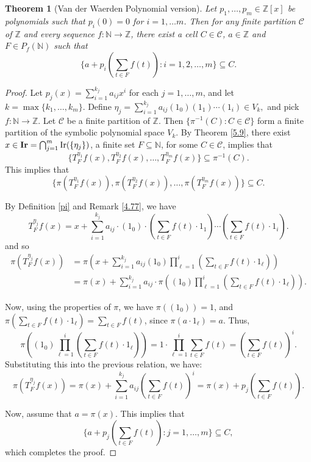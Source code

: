 \documentclass{amsart}
\newtheorem{theorem}{Theorem}[section]
\theoremstyle{definition}
\theoremstyle{remark}
\numberwithin{equation}{section}
\newcommand{\Ir}{{\bf{Ir}}}
\begin{document}
\begin{theorem}[Van der Waerden Polynomial version]{\label{van}}
Let $p_1,\ldots,p_m\in \mathbb{Z}[x]$ be polynomials such that $p_i(0)=0$ for $i=1,\ldots m$. Then for any finite partition $\mathcal{C}$ of \( \mathbb{Z} \) and every sequence $f:\mathbb{N}\to \mathbb{Z}$, there exist a cell $C\in\mathcal{C}$,  \(a \in \mathbb{Z} \) and $F\in P_f(\mathbb{N})$ such that
	 \[
	\{a+p_i(\sum_{t\in F}f(t)):i=1,2,\ldots,m\}\subseteq C.
	\] 
\end{theorem}
\begin{proof}
Let \( p_j(x) = \sum_{i=1}^{k_j} a_{ij} x^i \) for each \( j = 1, \ldots, m \), and let \( k = \max\{k_1, \ldots, k_m\} \). Define 
$\eta_j = \sum_{i=1}^{k_j} a_{ij}(1_0)(1_1)\cdots(1_i) \in V_k,$
and pick \( f : \mathbb{N} \to \mathbb{Z} \). Let \( \mathcal{C} \) be a finite partition of \( \mathbb{Z} \). Then \( \{ \pi^{-1}(C) : C \in \mathcal{C} \} \) form a finite partition of the symbolic polynomial space \( V_k \). By Theorem \ref{5.9}, there exist \( x \in \Ir = \bigcap_{j=1}^m \operatorname{Ir}(\{\eta_j\}) \), a finite set \( F \subseteq \mathbb{N} \),  for some \( C \in \mathcal{C} \), implies that 
\[
\{ T_F^{\eta_1} f(x), T_F^{\eta_2} f(x), \ldots, T_F^{\eta_m} f(x) \} \subseteq \pi^{-1}(C).
\]
This implies that
\[
\{ \pi(T_F^{\eta_1} f(x)), \pi(T_F^{\eta_2} f(x)), \ldots, \pi(T_F^{\eta_m} f(x)) \} \subseteq C.
\]

By Definition \ref{pi} and Remark \ref{4.77}, we have
\[
T_F^{\eta_j} f(x) = x + \sum_{i=1}^{k_j} a_{ij} \cdot (1_0) \cdot \left( \sum_{t \in F} f(t) \cdot 1_1 \right) \cdots \left( \sum_{t \in F} f(t) \cdot 1_i \right).
\]
and so 
\begin{align*}
	\pi(T_F^{\eta_j} f(x)) 
	&= \pi\left( x + \sum_{i=1}^{k_j} a_{ij} (1_0) \prod_{\ell=1}^{i} \left( \sum_{t \in F} f(t) \cdot 1_\ell \right) \right) \\
	&= \pi(x) + \sum_{i=1}^{k_j} a_{ij} \cdot \pi\left( (1_0) \prod_{\ell=1}^{i} \left( \sum_{t \in F} f(t) \cdot 1_\ell \right) \right).
\end{align*}

Now, using the properties of \( \pi \), we have \( \pi((1_0)) = 1 \), and \( \pi(\sum_{t \in F} f(t) \cdot 1_\ell) = \sum_{t \in F} f(t) \), since \( \pi(a \cdot 1_\ell) = a \). Thus,
\[
\pi\left( (1_0) \prod_{\ell=1}^{i} \left( \sum_{t \in F} f(t) \cdot 1_\ell \right) \right) 
= 1 \cdot \prod_{\ell=1}^{i} \sum_{t \in F} f(t) 
= \left( \sum_{t \in F} f(t) \right)^i.
\]
Substituting this into the previous relation, we have:
\[
\pi(T_F^{\eta_j} f(x)) = \pi(x) + \sum_{i=1}^{k_j} a_{ij} \left( \sum_{t \in F} f(t) \right)^i = \pi(x) + p_j\left( \sum_{t \in F} f(t) \right).
\]

Now, assume that $a=\pi(x)$. This implies that 
\[
\{ a + p_j(\sum_{t \in F} f(t)) : j = 1, \ldots, m \} \subseteq C,
\]
which completes the proof.
\end{proof}
\end{document}
